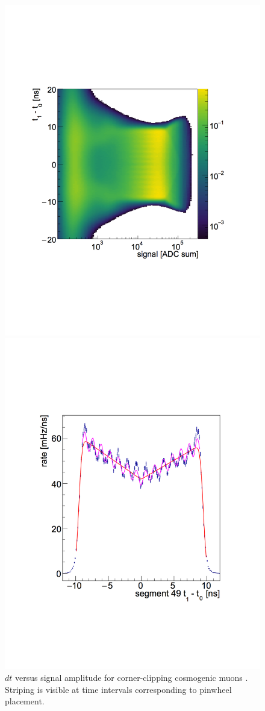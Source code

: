 \begin{figure}[h]
	\begin{minipage}[h]{0.5\linewidth}
		\centering
		\includegraphics[width=0.85\linewidth]{tex/5-analysis-images/dt_S_Hobbes}
		\caption[Muon $dt$ versus signal amplitude]{$dt$ versus signal amplitude for corner-clipping cosmogenic muons \cite{MM:2314}. Striping is visible at time intervals corresponding to pinwheel placement.}
		\label{fig:dtshobbes}
	\end{minipage}
	\begin{minipage}[h]{0.5\linewidth}
		\centering
		\includegraphics[width=0.75\linewidth]{tex/5-analysis-images/HobbesFit}

\end{minipage}
\end{figure}
